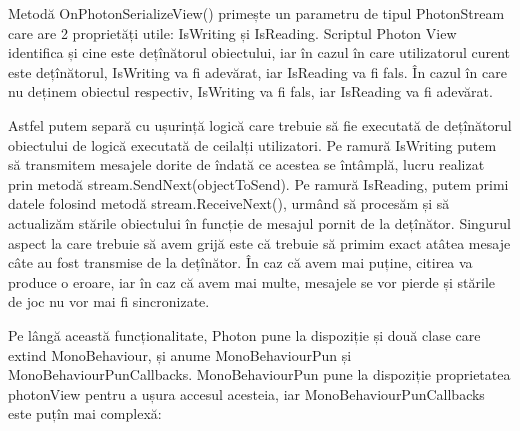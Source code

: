 \documentclass[12pt, a4paper]{article}
\begin{document}
	Metodă OnPhotonSerializeView() primește un parametru de tipul PhotonStream care are 2 proprietăți utile: IsWriting și IsReading. Scriptul Photon View identifica și cine este dețînătorul obiectului, iar în cazul în care utilizatorul curent este dețînătorul, IsWriting va fi adevărat, iar IsReading va fi fals. În cazul în care nu deținem obiectul respectiv, IsWriting va fi fals, iar IsReading va fi adevărat.
	\newline
	
	Astfel putem separă cu ușurință logică care trebuie să fie executată de dețînătorul obiectului de logică executată de ceilalți utilizatori. Pe ramură IsWriting putem să transmitem mesajele dorite de îndată ce acestea se întâmplă, lucru realizat prin metodă stream.SendNext(objectToSend). Pe ramură IsReading, putem primi datele folosind metodă stream.ReceiveNext(), urmând să procesăm și să actualizăm stările obiectului în funcție de mesajul pornit de la dețînător. Singurul aspect la care trebuie să avem grijă este că trebuie să primim exact atâtea mesaje câte au fost transmise de la dețînător. În caz că avem mai puține, citirea va produce o eroare, iar în caz că avem mai multe, mesajele se vor pierde și stările de joc nu vor mai fi sincronizate.
	\newline
	
	
	Pe lângă această funcționalitate, Photon pune la dispoziție și două clase care extind MonoBehaviour, și anume MonoBehaviourPun și MonoBehaviourPunCallbacks. MonoBehaviourPun pune la dispoziție proprietatea photonView pentru a ușura accesul acesteia, iar MonoBehaviourPunCallbacks este puțîn mai complexă:
	
\end{document}

